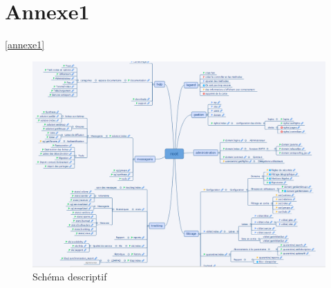 \section{Annexe1}
\pageref{annexe1}
\ref{annexe1}
\begin{figure}[!h]
\begin{center}
\includegraphics[width=15cm]{./image/xmind.png}
\end{center}
\caption{Schéma descriptif}
\end{figure}